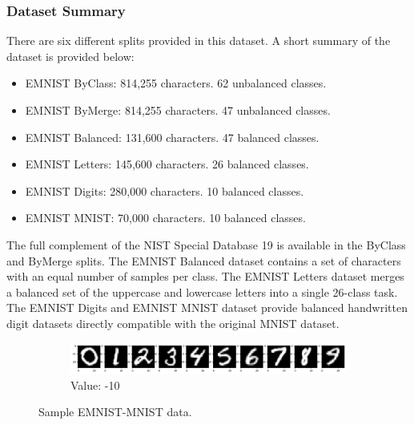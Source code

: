 \subsubsection{Dataset Summary}
There are six different splits provided in this dataset. A short summary of the dataset is provided below:
\begin{itemize}
  \item EMNIST ByClass: 814,255 characters. 62 unbalanced classes.
  \item EMNIST ByMerge: 814,255 characters. 47 unbalanced classes.
  \item EMNIST Balanced:  131,600 characters. 47 balanced classes.
  \item EMNIST Letters: 145,600 characters. 26 balanced classes.
  \item EMNIST Digits: 280,000 characters. 10 balanced classes.
  \item EMNIST MNIST: 70,000 characters. 10 balanced classes.
\end{itemize}
The full complement of the NIST Special Database 19 is available in the ByClass and ByMerge splits. The EMNIST Balanced dataset contains a set of characters with an equal number of samples per class.
The EMNIST Letters dataset merges a balanced set of the uppercase and lowercase letters into a single 26-class task. The EMNIST Digits and EMNIST MNIST dataset provide balanced handwritten digit datasets directly compatible with the original MNIST dataset.

\begin{figure}[htb!]
        \centering
        \begin{subfigure}[b]{.3\textwidth}
            \centering
            \includegraphics[width=\linewidth]{images/digit.png}
            \caption{Value: -10}
            \label{fig:EMNIST MNIST dataset}
        \end{subfigure}%
        \caption{Sample EMNIST-MNIST data.}
        \label{fig:Rotate-misclassifications}
    \end{figure}
    \FloatBarrier